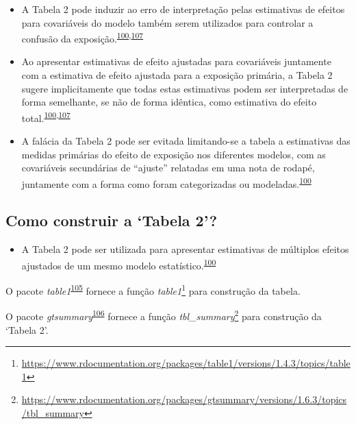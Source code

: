 \documentclass[
  a4paper,
]{book}
\providecommand{\tightlist}{%
  \setlength{\itemsep}{0pt}\setlength{\parskip}{0pt}}
\renewcommand{\href}[2]{#2\footnote{\url{#1}}}
\newenvironment{infobox}[1]
  {
  \begin{itemize}
  \renewcommand{\labelitemi}{
    \raisebox{-.7\height}[0pt][0pt]{
      {\setkeys{Gin}{width=3em,keepaspectratio}
        \texttt{[image: \#1]}}
    }
  }
  \setlength{\fboxsep}{1em}
  \begin{blackbox}
  \item
  }
  {
  \end{blackbox}
  \end{itemize}
  }
\begin{document}
\begin{itemize}
\item
  A Tabela 2 pode induzir ao erro de interpretação pelas estimativas de efeitos para covariáveis do modelo também serem utilizados para controlar a confusão da exposição.\textsuperscript{\protect\hyperlink{ref-Westreich2013}{100},\protect\hyperlink{ref-bandoli2018}{107}}
\item
  Ao apresentar estimativas de efeito ajustadas para covariáveis juntamente com a estimativa de efeito ajustada para a exposição primária, a Tabela 2 sugere implicitamente que todas estas estimativas podem ser interpretadas de forma semelhante, se não de forma idêntica, como estimativa do efeito total.\textsuperscript{\protect\hyperlink{ref-Westreich2013}{100},\protect\hyperlink{ref-bandoli2018}{107}}
\item
  A falácia da Tabela 2 pode ser evitada limitando-se a tabela a estimativas das medidas primárias do efeito de exposição nos diferentes modelos, com as covariáveis secundárias de ``ajuste'' relatadas em uma nota de rodapé, juntamente com a forma como foram categorizadas ou modeladas.\textsuperscript{\protect\hyperlink{ref-Westreich2013}{100}}
\end{itemize}

\hypertarget{como-construir-a-tabela-2}{%
\subsection{Como construir a `Tabela 2'?}\label{como-construir-a-tabela-2}}

\begin{itemize}
\tightlist
\item
  A Tabela 2 pode ser utilizada para apresentar estimativas de múltiplos efeitos ajustados de um mesmo modelo estatístico.\textsuperscript{\protect\hyperlink{ref-Westreich2013}{100}}
\end{itemize}

\begin{infobox}{images/Rlogo}
O pacote \emph{table1}\textsuperscript{\protect\hyperlink{ref-table1}{105}} fornece a função \href{https://www.rdocumentation.org/packages/table1/versions/1.4.3/topics/table1}{\emph{table1}} para construção da tabela.

\end{infobox}

\begin{infobox}{images/Rlogo}
O pacote \emph{gtsummary}\textsuperscript{\protect\hyperlink{ref-gtsummary-2}{106}} fornece a função \href{https://www.rdocumentation.org/packages/gtsummary/versions/1.6.3/topics/tbl_summary}{\emph{tbl\_summary}} para construção da `Tabela 2'.

\end{infobox}
\end{document}
